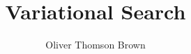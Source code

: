 \documentclass[a4paper,twoside,11pt]{article}
\author{Oliver Thomson Brown}
\title{Variational Search}
\newcommand*{\chappath}{../../include/chapters}
\newcommand*{\refpath}{../../include/refs}
\newenvironment{levelup}%
  {%
   \let\subsubsection\subsection%
   \let\subsection\section%
  }{}
\begin{document}
\maketitle

\tableofcontents
\vspace{5mm}

\begin{levelup}

\end{levelup}



\end{document}
